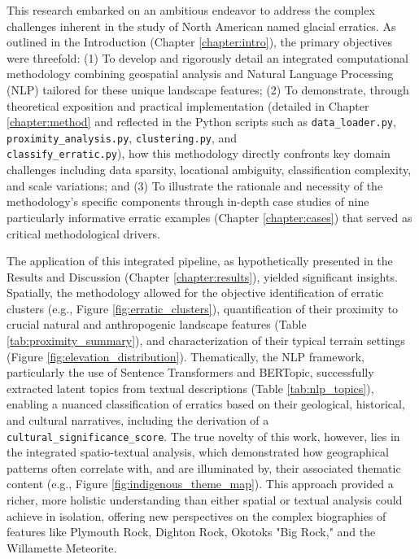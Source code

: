 \documentclass[
11pt, %
english, %
singlespacing, %
headsepline, %
]{MastersDoctoralThesis} %
\begin{document}
This research embarked on an ambitious endeavor to address the complex challenges inherent in the study of North American named glacial erratics. As outlined in the Introduction (Chapter \ref{chapter:intro}), the primary objectives were threefold: (1) To develop and rigorously detail an integrated computational methodology combining geospatial analysis and Natural Language Processing (NLP) tailored for these unique landscape features; (2) To demonstrate, through theoretical exposition and practical implementation (detailed in Chapter \ref{chapter:method} and reflected in the Python scripts such as \texttt{data\_loader.py}, \texttt{proximity\_analysis.py}, \texttt{clustering.py}, and \\ \texttt{classify\_erratic.py}), how this methodology directly confronts key domain challenges including data sparsity, locational ambiguity, classification complexity, and scale variations; and (3) To illustrate the rationale and necessity of the methodology's specific components through in-depth case studies of nine particularly informative erratic examples (Chapter \ref{chapter:cases}) that served as critical methodological drivers.

The application of this integrated pipeline, as hypothetically presented in the Results and Discussion (Chapter \ref{chapter:results}), yielded significant insights. Spatially, the methodology allowed for the objective identification of erratic clusters (e.g., Figure \ref{fig:erratic_clusters}), quantification of their proximity to crucial natural and anthropogenic landscape features (Table \ref{tab:proximity_summary}), and characterization of their typical terrain settings (Figure \ref{fig:elevation_distribution}). Thematically, the NLP framework, particularly the use of Sentence Transformers and BERTopic, successfully extracted latent topics from textual descriptions (Table \ref{tab:nlp_topics}), enabling a nuanced classification of erratics based on their geological, historical, and cultural narratives, including the derivation of a \texttt{cultural\_significance\_score}. The true novelty of this work, however, lies in the integrated spatio-textual analysis, which demonstrated how geographical patterns often correlate with, and are illuminated by, their associated thematic content (e.g., Figure \ref{fig:indigenous_theme_map}). This approach provided a richer, more holistic understanding than either spatial or textual analysis could achieve in isolation, offering new perspectives on the complex biographies of features like Plymouth Rock, Dighton Rock, Okotoks "Big Rock," and the Willamette Meteorite.
\end{document}
